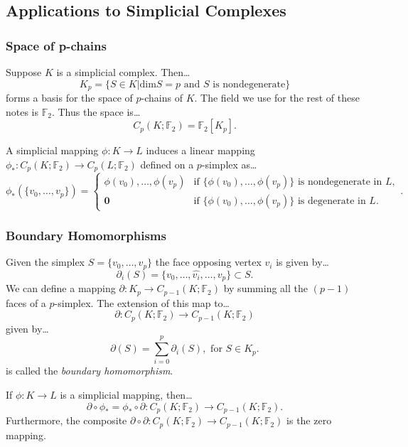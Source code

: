 \subsection{Applications to Simplicial Complexes}\label{simplicialhomology}

\subsubsection{Space of p-chains}\label{pchains}
Suppose $K$ is a simplicial complex. Then\dots
$$K_p = \{ S \in K | \textrm{dim} S = p \textrm{ and } S \textrm{ is nondegenerate} \}$$
forms a basis for the space of $p$-chains of $K$. The field we use for the rest of these notes is $\mathbb{F}_2$.
Thus the space is\dots
$$C_p(K; \mathbb{F}_2) = \mathbb{F}_2[K_p].$$

\noindent A simplicial mapping $\phi : K \rightarrow L$ induces a linear mapping $\phi_* : C_p(K; \mathbb{F}_2) \rightarrow C_p(L; \mathbb{F}_2)$
defined on a $p$-simplex as\dots
\[
\phi_*(\{v_0,\dots,v_p\}) = \begin{cases}
                                \phi(v_0),\dots,\phi(v_p) & \textrm{if } \{ \phi(v_0), \dots, \phi(v_p) \} \textrm{ is nondegenerate in } L,\\
                                \textbf{0} & \textrm{if } \{ \phi(v_0), \dots, \phi(v_p) \} \textrm{ is degenerate in } L.
                            \end{cases}.
\]

\subsubsection{Boundary Homomorphisms}\label{boundaryhomomorphism}
Given the simplex $S = \{ v_0, \dots, v_p \}$ the face opposing vertex $v_i$ is given by\dots
$$\partial_i(S) = \{ v_0, \dots, \hat{v_i}, \dots, v_p \} \subset S.$$
We can define a mapping $\partial : K_p \rightarrow C_{p-1}(K; \mathbb{F}_2)$ by summing all the $(p-1)$
faces of a $p$-simplex. The extension of this map to\dots
$$\partial : C_{p}(K; \mathbb{F}_2) \rightarrow C_{p-1}(K; \mathbb{F}_2)$$
given by\dots
$$\partial(S) = \sum_{i=0}^p \partial_i(S), \textrm{ for } S \in K_p.$$
is called the \emph{boundary homomorphism}.

\begin{proposition}
If $\phi : K \rightarrow L$ is a simplicial mapping, then\dots
$$\partial \circ \phi_* = \phi_* \circ \partial : C_{p}(K; \mathbb{F}_2) \rightarrow C_{p-1}(K; \mathbb{F}_2).$$
Furthermore, the composite $\partial \circ \partial : C_p(K; \mathbb{F}_2) \rightarrow C_{p-1}(K; \mathbb{F}_2)$ is
the zero mapping.
\end{proposition}

